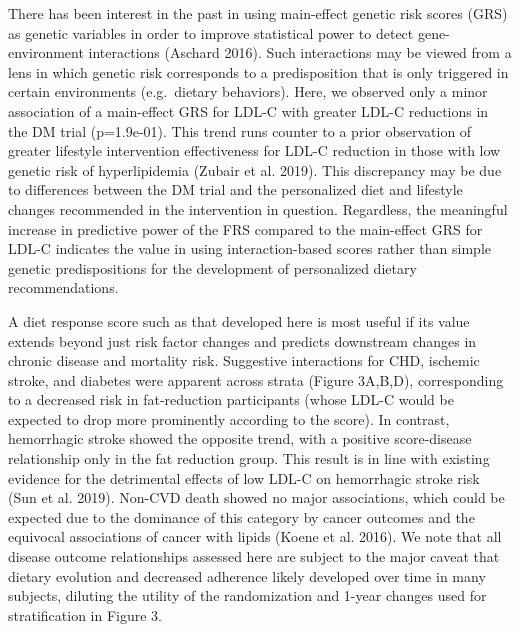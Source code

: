 \documentclass[]{article}
\begin{document}
There has been interest in the past in using main-effect genetic risk
scores (GRS) as genetic variables in order to improve statistical power
to detect gene-environment interactions (Aschard 2016). Such
interactions may be viewed from a lens in which genetic risk corresponds
to a predisposition that is only triggered in certain environments
(e.g.~dietary behaviors). Here, we observed only a minor association of
a main-effect GRS for LDL-C with greater LDL-C reductions in the DM
trial (p=1.9e-01). This trend runs counter to a prior observation of
greater lifestyle intervention effectiveness for LDL-C reduction in
those with low genetic risk of hyperlipidemia (Zubair et al. 2019). This
discrepancy may be due to differences between the DM trial and the
personalized diet and lifestyle changes recommended in the intervention
in question. Regardless, the meaningful increase in predictive power of
the FRS compared to the main-effect GRS for LDL-C indicates the value in
using interaction-based scores rather than simple genetic
predispositions for the development of personalized dietary
recommendations.

A diet response score such as that developed here is most useful if its
value extends beyond just risk factor changes and predicts downstream
changes in chronic disease and mortality risk. Suggestive interactions
for CHD, ischemic stroke, and diabetes were apparent across strata
(Figure 3A,B,D), corresponding to a decreased risk in fat-reduction
participants (whose LDL-C would be expected to drop more prominently
according to the score). In contrast, hemorrhagic stroke showed the
opposite trend, with a positive score-disease relationship only in the
fat reduction group. This result is in line with existing evidence for
the detrimental effects of low LDL-C on hemorrhagic stroke risk (Sun et
al. 2019). Non-CVD death showed no major associations, which could be
expected due to the dominance of this category by cancer outcomes and
the equivocal associations of cancer with lipids (Koene et al. 2016). We
note that all disease outcome relationships assessed here are subject to
the major caveat that dietary evolution and decreased adherence likely
developed over time in many subjects, diluting the utility of the
randomization and 1-year changes used for stratification in Figure 3.
\end{document}

